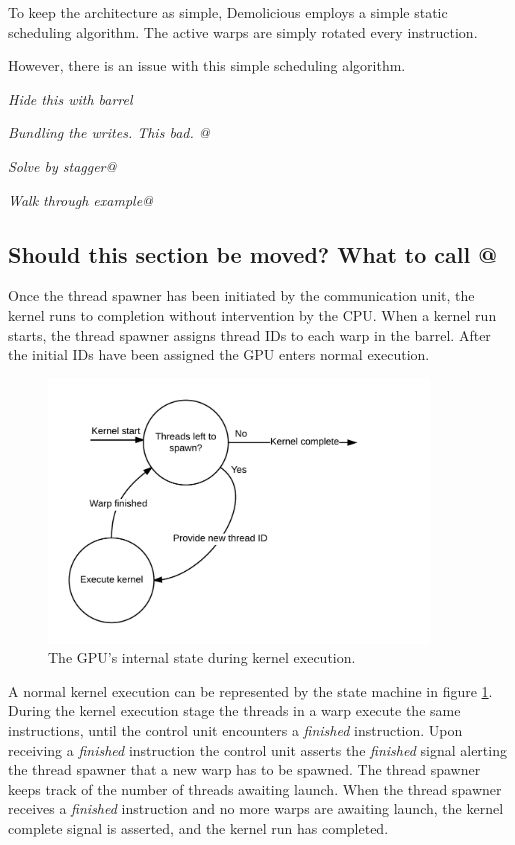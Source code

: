 \documentclass[../main/report.tex]{subfiles}
\begin{document}
To keep the architecture as simple, Demolicious employs a simple static scheduling algorithm. 
The active warps are simply rotated every instruction.

However, there is an issue with this simple scheduling algorithm.  
 



\emph{Hide this with barrel}




\emph{Bundling the writes. This bad. @}

\emph{Solve by stagger@}

\emph{Walk through example@}


\subsection{Should this section be moved? What to call @}

Once the thread spawner has been initiated by the communication unit, the kernel runs to completion without intervention by the CPU. 
When a kernel run starts, the thread spawner assigns thread IDs to each warp in the barrel.
After the initial IDs have been assigned the GPU enters normal execution.
\begin{figure}[H]
    \centering
    \includegraphics[width=0.9\textwidth]{../gpu/diagrams/kernel_run_state_machine.png}
    \caption{The GPU's internal state during kernel execution.}
    \label{fig:kernel_run_state_machine}
\end{figure}
A normal kernel execution can be represented by the state machine in figure \ref{fig:kernel_run_state_machine}.
During the kernel execution stage the threads in a warp execute the same instructions, until the control unit encounters a \emph{finished} instruction.
Upon receiving a \emph{finished} instruction the control unit asserts the \emph{finished} signal alerting the thread spawner that a new warp has to be spawned.
The thread spawner keeps track of the number of threads awaiting launch.
When the thread spawner receives a \emph{finished} instruction and no more warps are awaiting launch, the kernel complete signal is asserted, and the kernel run has completed.
\end{document}
